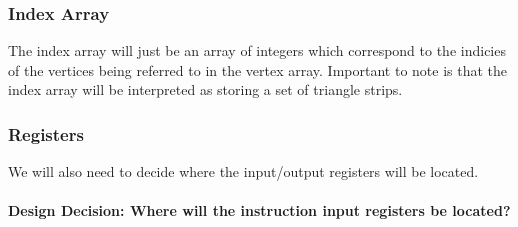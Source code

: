 \subsubsection{Index Array}
The index array will just be an array of integers which correspond to the indicies of the vertices being referred to in the vertex array. Important to note is that the index array will be interpreted as storing a set of triangle strips.

\subsubsection{Registers}
We will also need to decide where the input/output registers will be located.
\paragraph{\textbf{Design Decision: Where will the instruction input registers be located?}}

